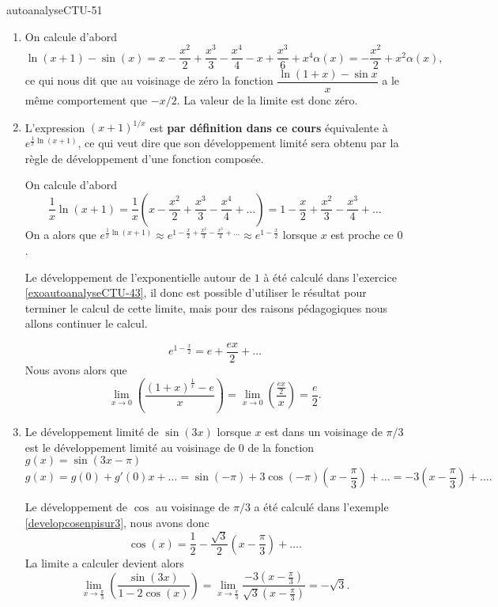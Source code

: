 
\begin{corrige}{autoanalyseCTU-51}

 
 
   \begin{enumerate}
 \item On calcule d'abord  
\[
\ln(x+1)-\sin(x) =x -\frac{x^2}{2} + \frac{x^3}{3} -\frac{x^4}{4} - x+\frac{x^3}{6} + x^4\alpha(x)= -\frac{x^2}{2}+  x^2\alpha(x),
\]
ce qui nous dit que au voisinage de zéro la fonction $\displaystyle \dfrac{\ln(1+x)-\sin x}{x}$ a le m\^eme comportement que $-x/2$. La valeur de la limite est donc zéro. 
   \item L'expression $(x+1)^{1/x}$ est {\bf par définition dans ce cours} équivalente à $e^{\frac{1}{x}\ln(x+1)}$, ce qui veut dire que son développement limité sera obtenu par la règle de développement d'une fonction composée. 

On calcule d'abord 
\[
\frac{1}{x}\ln(x+1) =\frac{1}{x} \left(x -\frac{x^2}{2} + \frac{x^3}{3} -\frac{x^4}{4} + \ldots\right) = 1 -\frac{x}{2} + \frac{x^2}{3} -\frac{x^3}{4} + \ldots
\]
On a alors que $e^{\frac{1}{x}\ln(x+1)}\approx e^{1 -\frac{x}{2} + \frac{x^2}{3} -\frac{x^3}{4} + \ldots}\approx e^{1 -\frac{x}{2}}$ lorsque $x$ est proche ce $0$. 
\begin{remark}
  Le développement de l'exponentielle autour de $1$ à été calculé dans l'exercice \ref{exoautoanalyseCTU-43}, il donc est possible d'utiliser le résultat pour terminer le calcul de cette limite, mais pour des raisons pédagogiques nous allons continuer le calcul.  
\end{remark}
\begin{equation*}
  e^{1 -\frac{x}{2}} = e +\frac{ex}{2} + \ldots
\end{equation*}
Nous avons alors que 
\[
\lim_{x\to 0}\left(\dfrac{(1+x)^{\frac{1}{x}}-e}{x}\right) = \lim_{x\to 0}\left(\dfrac{\frac{ex}{2}}{x}\right) = \frac{e}{2}.
\]  
   \item Le développement limité de $\sin(3x)$ lorsque $x$ est dans un voisinage de $\pi/3$ est le développement limité au voisinage de $0$ de la fonction $g(x) = \sin\left(3x-\pi\right)$ 
\[
g(x) = g(0) + g'(0) x + \ldots = \sin(-\pi) + 3\cos(-\pi) \left(x-\frac{\pi}{3}\right) + \ldots = -3\left(x-\frac{\pi}{3}\right) + \ldots.
\] 

Le développement de $\cos$ au voisinage de $\pi/3$ a été calculé dans l'exemple \ref{developcosenpisur3}, nous avons donc 
\[
\cos(x) = \frac{1}{2} -\frac{\sqrt{3}}{2}\left(x-\frac{\pi}{3}\right) + \ldots.
\]
La limite a calculer devient alors 
\[
\lim_{x\to \frac{\pi}{3}}\left(\dfrac{\sin (3x)}{1-2\cos (x)}\right) = \lim_{x\to \frac{\pi}{3}}\dfrac{-3\left(x-\frac{\pi}{3}\right)}{\sqrt{3}\left(x-\frac{\pi}{3}\right)} = -\sqrt{3}.
\] 
   \end{enumerate}



\end{corrige}   
